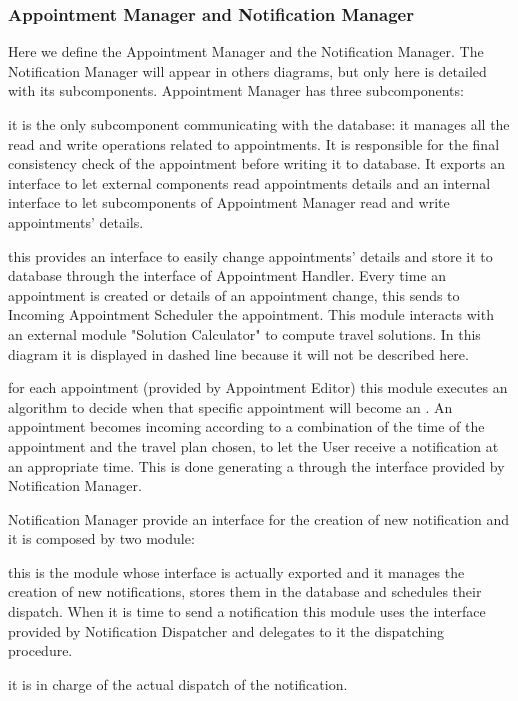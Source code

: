 	\subsubsection{Appointment Manager and Notification Manager}
		\label{sect:AppointmentManager}
		\label{sect:NotificationManager}
		Here we define the Appointment Manager and the Notification Manager. The Notification Manager will appear in others diagrams, but only here is detailed with its subcomponents. 
		\medskip\newline
		Appointment Manager has three subcomponents:		
		\begin{description}[before={\renewcommand{\makelabel}[1]{-- \textit{##1}:}}]
			\item[Appointment Handler] it is the only subcomponent communicating with the database: it manages all the read and write operations related to appointments. It is responsible for the final consistency check of the appointment before writing it to database. It exports an interface to let external components read appointments details and an internal interface to let subcomponents of Appointment Manager read and write appointments' details.
			\item[Appointment Editor] this provides an interface to easily change appointments' details and store it to database through the interface of Appointment Handler. Every time an appointment is created or details of an appointment change, this sends to Incoming Appointment Scheduler the appointment. This module interacts with an external module "Solution Calculator" to compute travel solutions. In this diagram it is displayed in dashed line because it will not be described here.
			\item[Incoming Appointment Scheduler] for each appointment (provided by Appointment Editor) this module executes an algorithm to decide when that specific appointment will become an . An appointment becomes incoming according to a combination of the time of the appointment and the travel plan chosen, to let the User receive a notification at an appropriate time. This is done generating a  through the interface provided by Notification Manager.
		\end{description}
		\bigskip
		Notification Manager provide an interface for the creation of new notification and it is composed by two module:
		\begin{description}[before={\renewcommand{\makelabel}[1]{-- \textit{##1}:}}]
			\item[Notification Scheduler] this is the module whose interface is actually exported and it manages the creation of new notifications, stores them in the database and schedules their dispatch. When it is time to send a notification this module uses the interface provided by Notification Dispatcher and delegates to it the dispatching procedure.
			\item[Notification Dispatcher] it is in charge of the actual dispatch of the notification.
		\end{description}
		
